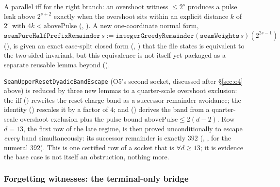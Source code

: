 A parallel iff for the right branch: an overshoot witness $\le2^s$ produces a pulse leak above
$2^{s+2}$ exactly when the overshoot sits within an explicit distance $k$ of $2^s$ with
$4k<\mathrm{abovePulse}$ (,
). A new one-coordinate normal form, $\mathtt{seamPureHalfPrefixRemainder}\,s :=
\mathtt{integerGreedyRemainder}(\mathtt{seamWeights}\,s)(2^{2s-1})$
(), is given an exact
case-split closed form (,
) that the file states is equivalent to the two-sided invariant, but this equivalence is not
itself yet packaged as a separate reusable lemma beyond
 ().

\begin{obs}
\texttt{SeamUpperResetDyadicBandEscape} (O5's second socket, discussed after \S\ref{sec:o4} above) is
reduced by three new lemmas to a quarter-scale overshoot exclusion: the iff
() rewrites the reset-charge band as a successor-remainder avoidance; the identity
() rescales it by a factor of $4$; and
 ()
derives the band from a quarter-scale overshoot exclusion plus the pulse bound $\mathrm{abovePulse}\le
2(d-2)$. Row $d=13$, the first row of the late regime, is then proved unconditionally to escape
\emph{every} band simultaneously: its successor remainder is exactly $392$
(,
,  for the numeral $392$). This is one certified row of a socket that is $\forall
d\ge13$; it is evidence the base case is not itself an obstruction, nothing more.
\end{obs}

\subsubsection{Forgetting witnesses: the terminal-only bridge}

